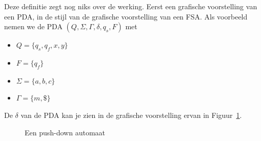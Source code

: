 
Deze definitie zegt nog niks over de werking. Eerst een grafische
voorstelling van een PDA, in de stijl van de grafische voorstelling
van een FSA. Als voorbeeld nemen we de PDA
$(Q,\Sigma,\Gamma,\delta,q_s,F)$ met

\begin{itemize}
\item $Q = \{q_s, q_f, x, y\}$
\item $F = \{q_f\}$
\item $\Sigma = \{a,b,c\}$
\item $\Gamma = \{m, \$\}$
\end{itemize}

\newpage
De $\delta$ van de PDA kan je zien in de grafische voorstelling ervan
in Figuur~\ref{pda2}.

\medskip
\begin{figure}[h]
\caption{Een push-down automaat\label{pda2}}
\end{figure}

